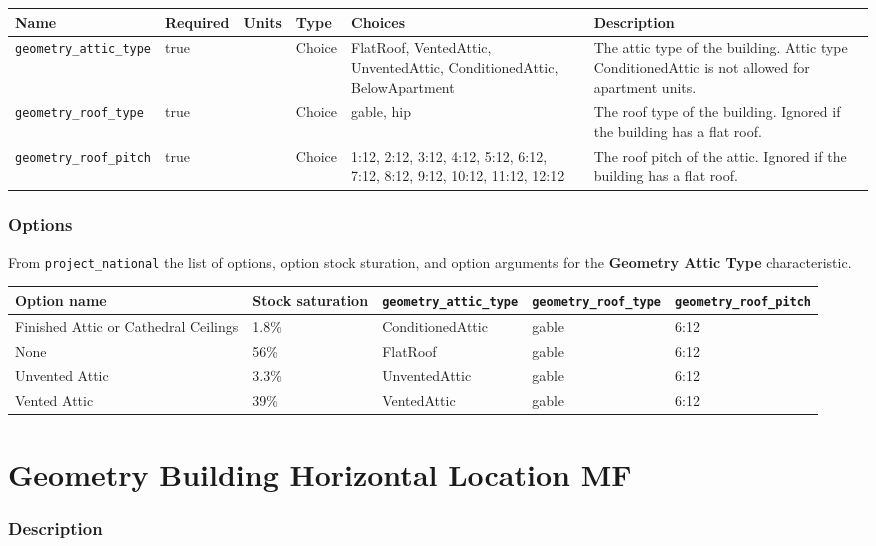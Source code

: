 \begin{longtable}[]{@{}llllll@{}}
\toprule\noalign{}
Name & Required & Units & Type & Choices & Description \\
\midrule\noalign{}
\endhead
\bottomrule\noalign{}
\endlastfoot
\texttt{geometry\_attic\_type} & true & & Choice & FlatRoof,
VentedAttic, UnventedAttic, ConditionedAttic, BelowApartment & The attic
type of the building. Attic type ConditionedAttic is not allowed for
apartment units. \\
\texttt{geometry\_roof\_type} & true & & Choice & gable, hip & The roof
type of the building. Ignored if the building has a flat roof. \\
\texttt{geometry\_roof\_pitch} & true & & Choice & 1:12, 2:12, 3:12,
4:12, 5:12, 6:12, 7:12, 8:12, 9:12, 10:12, 11:12, 12:12 & The roof pitch
of the attic. Ignored if the building has a flat roof. \\
\end{longtable}

\subsubsection{Options}\label{options-43}

From \texttt{project\_national} the list of options, option stock
sturation, and option arguments for the \textbf{Geometry Attic Type}
characteristic.

\begin{longtable}[]{@{}lllll@{}}
\toprule\noalign{}
Option name & Stock saturation & \texttt{geometry\_attic\_type} &
\texttt{geometry\_roof\_type} & \texttt{geometry\_roof\_pitch} \\
\midrule\noalign{}
\endhead
\bottomrule\noalign{}
\endlastfoot
Finished Attic or Cathedral Ceilings & 1.8\% & ConditionedAttic & gable
& 6:12 \\
None & 56\% & FlatRoof & gable & 6:12 \\
Unvented Attic & 3.3\% & UnventedAttic & gable & 6:12 \\
Vented Attic & 39\% & VentedAttic & gable & 6:12 \\
\end{longtable}

\section{Geometry Building Horizontal Location
MF}\label{geometry_building_horizontal_location_mf}

\subsubsection{Description}\label{description-44}

